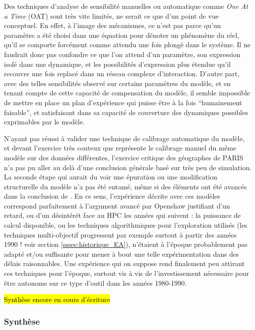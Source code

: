 Des techniques d'analyse de sensibilité manuelles ou automatique  comme \textit{One At a Time} (OAT) sont très vite limités, ne serait ce que d'un point de vue conceptuel. En effet, à l'image des mécanismes, ce n'est pas parce qu'un paramètre a été choisi dans une équation pour dénoter un phénomène du réel, qu'il se comporte forcément comme attendu une fois plongé dans le système. Il ne faudrait donc pas confondre ce que l'on attend d'un paramètre, son expression isolé dans une dynamique, et les possibilités d'expression plus étendue qu'il recouvre une fois replacé dans un réseau complexe d'interaction. D'autre part, avec des telles sensibilités observé sur certains paramètres du modèle, et en tenant compte de cette capacité de compensation du modèle, il semble impossible de mettre en place un plan d'expérience qui puisse être à la fois \enquote{humainement faisable}, et satisfaisant dans sa capacité de couverture des dynamiques possibles exprimables par le modèle.

N'ayant pas réussi à valider une technique de calibrage automatique du modèle, et devant l'exercice très couteux que représente le calibrage manuel du même modèle sur des données différentes, l'exercice critique des géographes de PARIS n'a pas pu aller au delà d'une conclusion générale basé sur très peu de simulation. La seconde étape qui aurait du voir une épuration ou une modification structurelle du modèle n'a pas été entamé, même si des éléments ont été avancés dans la conclusion de \textcite{Sanders1984}. En ce sens, l'expérience décrite avec ces modèles correspond parfaitement à l'argument avancé par Openshaw justifiant d'un retard, ou d'un désintérét face au HPC les années qui suivent : la puissance de calcul disponible, ou les techniques algorithmiques pour l'exploration utilisés (les techniques multi-objectif progressent par exemple surtout à partir des années 1990 ! voir section \ref{sssec:historique_EA}), n'étaient à l'époque probablement pas adapté et/ou suffisante pour mener à bout une telle expérimentation dans des délais raisonnables. Une expérience qui on suppose rend finalement peu attirant ces techniques pour l'époque, surtout vis à vis de l'investissement nécessaire pour être autonome sur ce type d'outil dans les années 1980-1990.

\hl{Synthèse encore en cours d'écriture}

\subsubsection{Synthèse}
\label{sssec:synthese}

